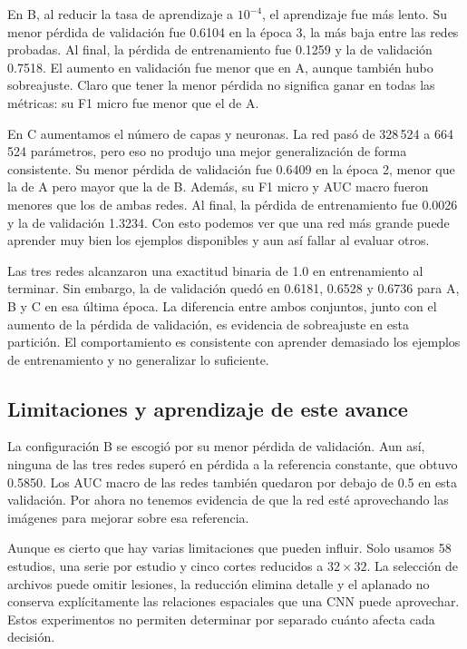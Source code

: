 \documentclass[eng]{ajceam-class}
\begin{document}
En B, al reducir la tasa de aprendizaje a $10^{-4}$, el aprendizaje fue más lento. Su menor pérdida de validación fue 0.6104 en la época 3, la más baja entre las redes probadas. Al final, la pérdida de entrenamiento fue 0.1259 y la de validación 0.7518. El aumento en validación fue menor que en A, aunque también hubo sobreajuste. Claro que tener la menor pérdida no significa ganar en todas las métricas: su F1 micro fue menor que el de A.

En C aumentamos el número de capas y neuronas. La red pasó de 328\,524 a 664\,524 parámetros, pero eso no produjo una mejor generalización de forma consistente. Su menor pérdida de validación fue 0.6409 en la época 2, menor que la de A pero mayor que la de B. Además, su F1 micro y AUC macro fueron menores que los de ambas redes. Al final, la pérdida de entrenamiento fue 0.0026 y la de validación 1.3234. Con esto podemos ver que una red más grande puede aprender muy bien los ejemplos disponibles y aun así fallar al evaluar otros.

Las tres redes alcanzaron una exactitud binaria de 1.0 en entrenamiento al terminar. Sin embargo, la de validación quedó en 0.6181, 0.6528 y 0.6736 para A, B y C en esa última época. La diferencia entre ambos conjuntos, junto con el aumento de la pérdida de validación, es evidencia de sobreajuste en esta partición. El comportamiento es consistente con aprender demasiado los ejemplos de entrenamiento y no generalizar lo suficiente.

\subsection{Limitaciones y aprendizaje de este avance}

La configuración B se escogió por su menor pérdida de validación. Aun así, ninguna de las tres redes superó en pérdida a la referencia constante, que obtuvo 0.5850. Los AUC macro de las redes también quedaron por debajo de 0.5 en esta validación. Por ahora no tenemos evidencia de que la red esté aprovechando las imágenes para mejorar sobre esa referencia.

Aunque es cierto que hay varias limitaciones que pueden influir. Solo usamos 58 estudios, una serie por estudio y cinco cortes reducidos a $32\times32$. La selección de archivos puede omitir lesiones, la reducción elimina detalle y el aplanado no conserva explícitamente las relaciones espaciales que una CNN puede aprovechar. Estos experimentos no permiten determinar por separado cuánto afecta cada decisión.
\end{document}
